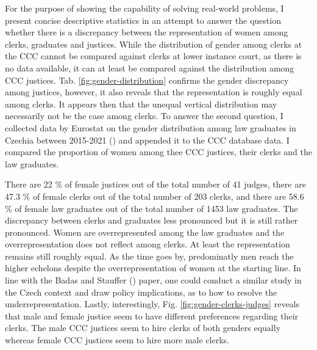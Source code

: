 \documentclass[
  11pt,
]{article}
\begin{document}
For the purpose of showing the capability of solving real-world problems, I present concise descriptive statistics in an attempt to answer the question whether there is a discrepancy between the representation of women among clerks, graduates and justices. While the distribution of gender among clerks at the CCC cannot be compared against clerks at lower instance court, as there is no data available, it can at least be compared against the distribution among CCC justices. Tab. \ref{fig:gender-distribution} confirms the gender discrepancy among justices, however, it also reveals that the representation is roughly equal among clerks. It appears then that the unequal vertical distribution may necessarily not be the case among clerks. To answer the second question, I collected data by Eurostat on the gender distribution among law graduates in Czechia between 2015-2021 () and appended it to the CCC database data.
I compared the proportion of women among thee CCC justices, their clerks and the law graduates.

There are 22 \% of female justices out of the total number of 41 judges, there are 47.3 \% of female clerks out of the total number of 203 clerks, and there are 58.6 \% of female law graduates out of the total number of 1453 law graduates. The discrepancy between clerks and graduates less pronounced but it is still rather pronounced. Women are overrepresented among the law graduates and the overrepresentation does not reflect among clerks. At least the representation remains still roughly equal. As the time goes by, predominatly men reach the higher echelons despite the overrepresentation of women at the starting line. In line with the Badas and Stauffer () paper, one could conduct a similar study in the Czech context and draw policy implications, as to how to resolve the underrepresentation. Lastly, interestingly, Fig. \ref{fig:gender-clerks-judges} reveals that male and female justice seem to have different preferences regarding their clerks. The male CCC justices seem to hire clerks of both genders equally whereas female CCC justices seem to hire more male clerks.
\end{document}
